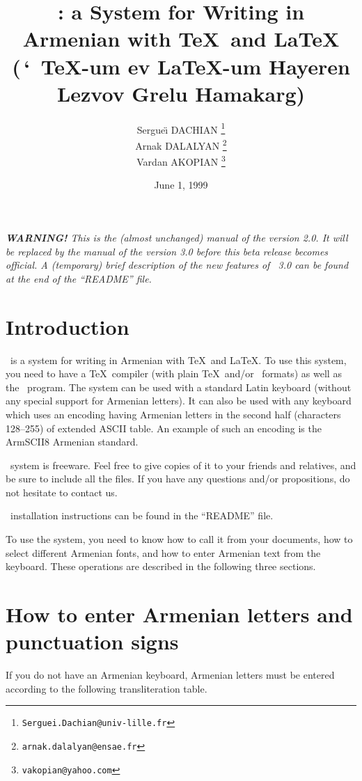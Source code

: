 \documentclass[12pt,a4paper,draft]{article}
\title{\latArmTeX: a System for Writing in Armenian with \TeX\ and \LaTeX\\
{\normalsize\artm (\ArmTeX$\,$` $\,${\aroff \TeX}-um ev {\aroff \LaTeX}-um
Hayeren Lezvov Grelu Hamakarg)}}
\author{%
Sergue\"{\i} DACHIAN \thanks{{\tt Serguei.Dachian@univ-lille.fr}}\\
Arnak DALALYAN \thanks{{\tt arnak.dalalyan@ensae.fr}}\\
Vardan AKOPIAN \thanks{{\tt vakopian@yahoo.com}}
}
\date{June 1, 1999}
\def\myindent{\leavevmode}
\begin{document}
\maketitle


\vglue -12cm
\noindent
%
\textsl{\textbf{WARNING!} This is the (almost unchanged) manual of the version
  2.0. It will be replaced by the manual of the version 3.0 before this beta
  release becomes official. A (temporary) brief description of the new
  features of \latArmTeX~3.0 can be found at the end of the ``README'' file.}
%
\vglue 10.43cm


\section{Introduction}

\myindent \latArmTeX\ is a system for writing in Armenian with \TeX\ and
\LaTeX. To use this system, you need to have a \TeX\ compiler (with plain
\TeX\ and/or \LaTeXe\ formats) as well as the \MF\ program. The system can be
used with a standard Latin keyboard (without any special support for Armenian
letters). It can also be used with any keyboard which uses an encoding having
Armenian letters in the second half (characters 128--255) of extended ASCII
table. An example of such an encoding is the ArmSCII8 Armenian standard.

\latArmTeX\ system is freeware. Feel free to give copies of it to your friends
and relatives, and be sure to include all the files. If you have any questions
and/or propositions, do not hesitate to contact us.

\latArmTeX\ installation instructions can be found in the ``README'' file.

To use the system, you need to know how to call it from your documents, how to
select different Armenian fonts, and how to enter Armenian text from the
keyboard. These operations are described in the following three sections.


\section{How to enter Armenian letters and punctuation signs}
\label{s2}

\myindent If you do not have an Armenian keyboard, Armenian letters must be
entered according to the following transliteration table.
\end{document}
